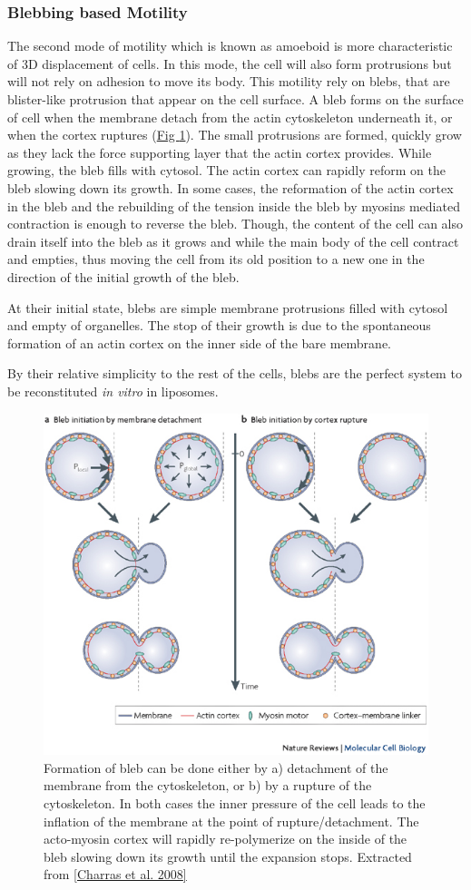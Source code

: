\documentclass[A4paperpaper,11pt,english]{sphinxmanual}
\begin{document}
\subsubsection{Blebbing based Motility}
\label{index-latex:blebbing-based-motility}
The second mode of motility which is known as amoeboid is more characteristic
of 3D displacement of cells. In this mode, the cell will also form protrusions
but will not rely on adhesion to move its body. This motility rely on blebs,
that are blister-like protrusion that appear on the cell surface. A bleb
forms on the surface of cell when the membrane detach from the actin
cytoskeleton underneath it, or when the cortex ruptures (\hyperref[index-latex:fig-bleb]{Fig  \ref*{index-latex:fig-bleb}}). The small protrusions
are formed, quickly grow as they lack the force supporting layer that the actin
cortex provides. While growing, the bleb fills with cytosol. The actin
cortex can rapidly reform on the bleb slowing down its growth. In some cases,
the reformation of the actin cortex in the bleb and the rebuilding of the
tension inside the bleb by myosins mediated contraction is enough to reverse
the bleb. Though, the content of the cell can also drain itself into the bleb
as it grows and while the main body of the cell contract and empties, thus
moving the cell from its old position to a new one in the direction of the
initial growth of the bleb.

At their initial state, blebs are simple membrane protrusions filled with
cytosol and empty of organelles. The stop of their growth is due to the
spontaneous formation of an actin cortex on the inner side of the bare
membrane.

By their relative simplicity to the rest of the cells, blebs are the perfect
system to be reconstituted \emph{in vitro} in liposomes.
\begin{figure}[htbp]
\centering
\capstart

\includegraphics[width=0.400\linewidth]{Bleb-nature-paluch.jpg}
\caption{Formation of bleb can be done either by a) detachment of the membrane from
the cytoskeleton, or b) by a rupture of the cytoskeleton. In both cases the
inner pressure of the cell leads to the inflation of the membrane at the
point of rupture/detachment. The acto-myosin cortex will rapidly re-polymerize on
the inside of the bleb slowing down its growth until the expansion stops.
Extracted from {\hyperref[index-latex:charras2008]{{[}Charras et al. 2008{]}}}}\label{index-latex:fig-bleb}\end{figure}
\end{document}
